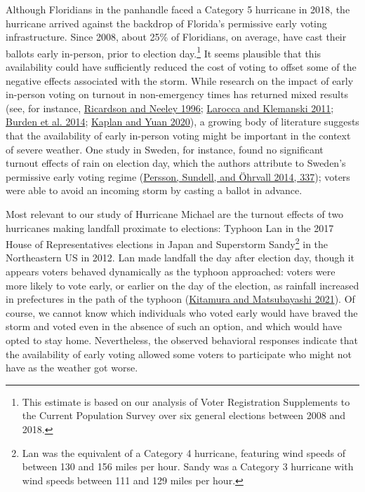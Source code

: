 \documentclass[
  12pt,
]{article}
\begin{document}
Although Floridians in the panhandle faced a Category 5 hurricane in 2018, the hurricane arrived against the backdrop of Florida's permissive early voting infrastructure. Since 2008, about 25\% of Floridians, on average, have cast their ballots early in-person, prior to election day.\footnote{This estimate is based on our analysis of Voter Registration Supplements to the Current Population Survey over six general elections between 2008 and 2018.} It seems plausible that this availability could have sufficiently reduced the cost of voting to offset some of the negative effects associated with the storm. While research on the impact of early in-person voting on turnout in non-emergency times has returned mixed results (see, for instance, \protect\hyperlink{ref-Ricardson1996}{Ricardson and Neeley 1996}; \protect\hyperlink{ref-Larocca2011}{Larocca and Klemanski 2011}; \protect\hyperlink{ref-Burden2014}{Burden et al. 2014}; \protect\hyperlink{ref-Kaplan2020}{Kaplan and Yuan 2020}), a growing body of literature suggests that the availability of early in-person voting might be important in the context of severe weather. One study in Sweden, for instance, found no significant turnout effects of rain on election day, which the authors attribute to Sweden's permissive early voting regime (\protect\hyperlink{ref-Persson2014}{Persson, Sundell, and Öhrvall 2014, 337}); voters were able to avoid an incoming storm by casting a ballot in advance.

Most relevant to our study of Hurricane Michael are the turnout effects of two hurricanes making landfall proximate to elections: Typhoon Lan in the 2017 House of Representatives elections in Japan and Superstorm Sandy\footnote{Lan was the equivalent of a Category 4 hurricane, featuring wind speeds of between 130 and 156 miles per hour. Sandy was a Category 3 hurricane with wind speeds between 111 and 129 miles per hour.} in the Northeastern US in 2012. Lan made landfall the day after election day, though it appears voters behaved dynamically as the typhoon approached: voters were more likely to vote early, or earlier on the day of the election, as rainfall increased in prefectures in the path of the typhoon (\protect\hyperlink{ref-Kitamura2021}{Kitamura and Matsubayashi 2021}). Of course, we cannot know which individuals who voted early would have braved the storm and voted even in the absence of such an option, and which would have opted to stay home. Nevertheless, the observed behavioral responses indicate that the availability of early voting allowed some voters to participate who might not have as the weather got worse.
\end{document}
